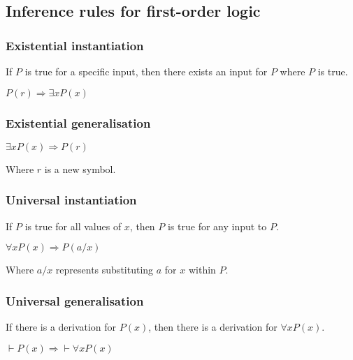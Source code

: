 
\subsection{Inference rules  for first-order logic}

\subsubsection{Existential instantiation}

If \(P\) is true for a specific input, then there exists an input for \(P\) where \(P\) is true.

\(P(r)\Rightarrow \exists xP(x)\)

\subsubsection{Existential generalisation}

\(\exists xP(x)\Rightarrow P(r)\)

Where \(r\) is a new symbol.

\subsubsection{Universal instantiation}

If \(P\) is true for all values of \(x\), then \(P\) is true for any input to \(P\).

\(\forall xP(x)\Rightarrow P(a/x)\)

Where \(a / x\) represents substituting \(a\) for \(x\) within \(P\).

\subsubsection{Universal generalisation}

If there is a derivation for \(P(x)\), then there is a derivation for \(\forall x P(x)\).

\(\vdash P(x)\Rightarrow \vdash \forall x P(x)\)

